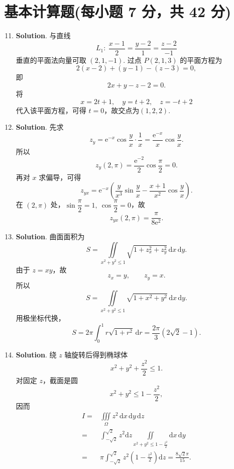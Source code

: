 \documentclass[../main.tex]{subfiles}
\begin{document}
\section{基本计算题(每小题 7 分，共 42 分)}
\begin{enumerate}
  \setcounter{enumi}{10}
  \item \textbf{Solution}. 与直线
        \[
          L_1:\ \frac{x-1}{2}=\frac{y-2}{1}=\frac{z-2}{-1}
        \]
        垂直的平面法向量可取 \((2,1,-1)\). 过点 \(P(2,1,3)\) 的平面方程为
        \[
          2(x-2)+(y-1)-(z-3)=0,
        \]
        即
        \[
          2x+y-z-2=0.
        \]
        将
        \[
          x=2t+1,\quad y=t+2,\quad z=-t+2
        \]
        代入该平面方程，可得 \(t=0\)，故交点为$(1,2,2)$.

  \item \textbf{Solution}. 先求
        \[
          z_y=\mathrm{e}^{-x}\cos\frac{y}{x}\cdot \frac{1}{x}=\frac{\mathrm{e}^{-x}}{x}\cos\frac{y}{x}.
        \]
        所以
        \[
          z_y(2,\pi)=\frac{\mathrm{e}^{-2}}{2}\cos\frac{\pi}{2}=0.
        \]
        再对 \(x\) 求偏导，可得
        \[
          z_{yx}=\mathrm{e}^{-x}\left(\frac{y}{x^{3}}\sin\frac{y}{x}-\frac{x+1}{x^{2}}\cos\frac{y}{x}\right).
        \]
        在 \((2,\pi)\) 处，\(\sin\dfrac{\pi}{2}=1,\ \cos\dfrac{\pi}{2}=0\)，故
        \[
          z_{yx}(2,\pi)=\frac{\pi}{8\mathrm{e}^2}.
        \]

  \item \textbf{Solution}. 曲面面积为
        \[
          S=\iint\limits_{x^2+y^2\le 1}\sqrt{1+z_x^2+z_y^2}\,\mathrm{d}x\,\mathrm{d}y.
        \]
        由于 \(z=xy\)，故
        \[
          z_x=y,\qquad z_y=x.
        \]
        所以
        \[
          S=\iint\limits_{x^2+y^2\le 1}\sqrt{1+x^2+y^2}\,\mathrm{d}x\,\mathrm{d}y.
        \]
        用极坐标代换，
        \[
          S=2\pi\int_0^1 r\sqrt{1+r^2}\,\mathrm{d}r
          =\frac{2\pi}{3}(2\sqrt2-1).
        \]

  \item \textbf{Solution}. 绕 \(z\) 轴旋转后得到椭球体
        \[
          x^2+y^2+\frac{z^2}{2}\le 1.
        \]
        对固定 \(z\)，截面是圆
        \[
          x^2+y^2\le 1-\frac{z^2}{2},
        \]
        因而
        \[
          \begin{aligned}
            I= {} & \iiint\limits_{\Omega} z^2\,\mathrm{d}x\,\mathrm{d}y\,\mathrm{d}z                                             \\
            = {}  & \int_{-\sqrt{2}}^{\sqrt{2}} z^2\mathrm{d}z \iint\limits_{x^2+y^2\le 1-\frac{z^2}{2}} \mathrm{d}x\,\mathrm{d}y \\
            = {}  & \pi\int_{-\sqrt{2}}^{\sqrt{2}} z^2\left(1-\frac{z^2}{2}\right)\mathrm{d}z=\frac{8\sqrt{2}\pi}{15}.
          \end{aligned}
        \]


\end{enumerate}
\end{document}

